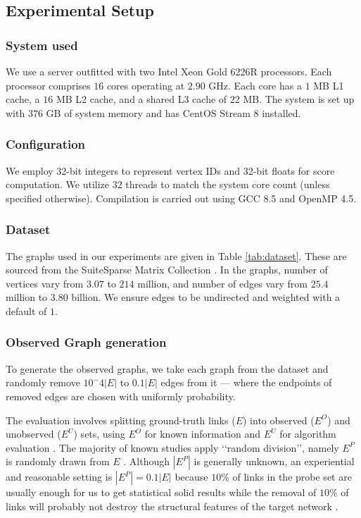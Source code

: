 \subsection{Experimental Setup}
\label{sec:setup}

\subsubsection{System used}

We use a server outfitted with two Intel Xeon Gold 6226R processors. Each processor comprises $16$ cores operating at $2.90$ GHz. Each core has a $1$ MB L1 cache, a $16$ MB L2 cache, and a shared L3 cache of $22$ MB. The system is set up with $376$ GB of system memory and has CentOS Stream 8 installed.\ok{}


\subsubsection{Configuration}

We employ 32-bit integers to represent vertex IDs and 32-bit floats for score computation. We utilize $32$ threads to match the system core count (unless specified otherwise). Compilation is carried out using GCC 8.5 and OpenMP 4.5.\ok{}


\subsubsection{Dataset}

The graphs used in our experiments are given in Table \ref{tab:dataset}. These are sourced from the SuiteSparse Matrix Collection \cite{suite19}. In the graphs, number of vertices vary from $3.07$ to $214$ million, and number of edges vary from $25.4$ million to $3.80$ billion. We ensure edges to be undirected and weighted with a default of $1$.


\subsubsection{Observed Graph generation}

To generate the observed graphs, we take each graph from the dataset and randomly remove $10^-4|E|$ to $0.1|E|$ edges from it --- where the endpoints of removed edges are chosen with uniformly probability.
The evaluation involves splitting ground-truth links ($E$) into observed ($E^O$) and unobserved ($E^U$) sets, using $E^O$ for known information and $E^U$ for algorithm evaluation \cite{arrar2023comprehensive}.
The majority of known studies apply ‘‘random division’’, namely $E^P$ is randomly drawn from $E$ \cite{zhou2021progresses}.
Although $|E^P|$ is generally unknown, an experiential and reasonable setting is  $|E^P| = 0.1 |E|$ because $10\%$ of links in the probe set are usually enough for us to get statistical solid results while the removal of $10\%$ of links will probably not destroy the structural features of the target network \cite{lu2015toward}.

